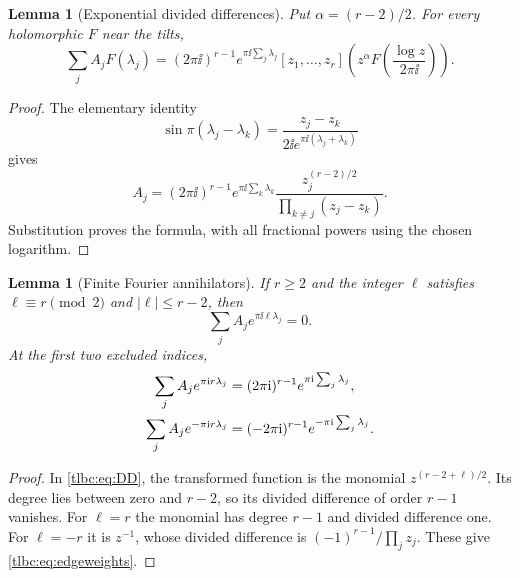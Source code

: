 \documentclass[11pt,letterpaper]{article}
\numberwithin{equation}{section}
\newtheorem{lemma}[theorem]{Lemma}
\theoremstyle{definition}\newtheorem{definition}[theorem]{Definition}
\theoremstyle{remark}\newtheorem{remark}[theorem]{Remark}
\begin{document}
\begin{lemma}[Exponential divided differences]\label{tlbc:lem:DD}
Put $\alpha=(r-2)/2$. For every holomorphic $F$ near the tilts,
\begin{equation}\label{tlbc:eq:DD}
 \sum_j A_jF(\lambda_j)
 =(2\pi\ii)^{r-1}e^{\pi\ii\sum_j\lambda_j}
 [z_1,\ldots,z_r]
 \left(z^\alpha F\left(\frac{\log z}{2\pi\ii}\right)\right).
\end{equation}
\end{lemma}
\begin{proof}
The elementary identity
\[
 \sin\pi(\lambda_j-\lambda_k)
 =\frac{z_j-z_k}{2\ii e^{\pi\ii(\lambda_j+\lambda_k)}}
\]
gives
\[
 A_j=(2\pi\ii)^{r-1}e^{\pi\ii\sum_k\lambda_k}
 \frac{z_j^{(r-2)/2}}{\prod_{k\ne j}(z_j-z_k)}.
\]
Substitution proves the formula, with all fractional powers using the chosen logarithm.
\end{proof}

\begin{lemma}[Finite Fourier annihilators]\label{tlbc:lem:annihilator}
If $r\ge2$ and the integer $\ell$ satisfies
$\ell\equiv r\pmod2$ and $|\ell|\le r-2$, then
\begin{equation}\label{tlbc:eq:annihilator}
 \sum_j A_j e^{\pi\ii\ell\lambda_j}=0.
\end{equation}
At the first two excluded indices,
\begin{align}
 \sum_j A_j e^{\pi\mathrm i r\lambda_j}
   &=(2\pi\mathrm i)^{r-1}e^{\pi\mathrm i\sum_j\lambda_j},\notag\\
 \sum_j A_j e^{-\pi\mathrm i r\lambda_j}
   &=(-2\pi\mathrm i)^{r-1}e^{-\pi\mathrm i\sum_j\lambda_j}.
 \label{tlbc:eq:edgeweights}
\end{align}
\end{lemma}
\begin{proof}
In \eqref{tlbc:eq:DD}, the transformed function is the monomial
$z^{(r-2+\ell)/2}$. Its degree lies between zero and $r-2$, so its divided difference of order $r-1$ vanishes. For $\ell=r$ the monomial has degree $r-1$ and divided difference one. For $\ell=-r$ it is $z^{-1}$, whose divided difference is $(-1)^{r-1}/\prod_jz_j$. These give \eqref{tlbc:eq:edgeweights}.
\end{proof}
\end{document}
